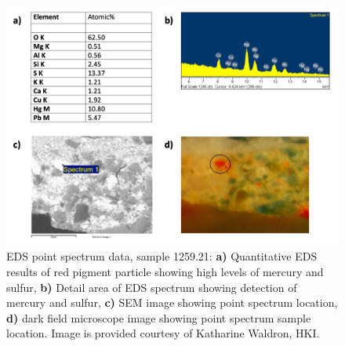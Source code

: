 \begin{figure}[H]
  \centering
  \includegraphics[width=0.8\linewidth]{1259.21_pointspec}
\caption[EDS point spectrum data, sample 1259.21.]{EDS point spectrum data, sample 1259.21: \textbf{a)} Quantitative EDS results of red pigment particle showing high levels of mercury and sulfur, \textbf{b)} Detail area of EDS spectrum showing detection of mercury and sulfur, \textbf{c)} SEM image showing point spectrum location, \textbf{d)} dark field microscope image showing point spectrum sample location. Image is provided courtesy of Katharine Waldron, HKI.}
\label{fig:1259.21_pointspec}
\end{figure}


